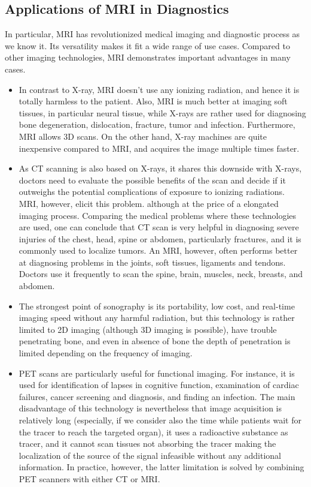 \subsection{Applications of MRI in Diagnostics}
In particular, MRI has revolutionized medical imaging and diagnostic process as we know it. Its versatility makes it fit a wide range of use cases. Compared to other imaging technologies, MRI demonstrates important advantages in many cases.
\begin{itemize}
    \item In contrast to X-ray, MRI doesn't use any ionizing radiation, and hence it is totally harmless to the patient. Also, MRI is much better at imaging soft tissues, in particular neural tissue,  while X-rays are rather used for diagnosing bone degeneration, dislocation, fracture, tumor and infection. Furthermore, MRI allows 3D scans. On the other hand, X-ray machines are quite inexpensive compared to MRI, and acquires the image multiple times faster.
    \item As CT scanning is also based on X-rays, it shares this downside with X-rays, doctors need to evaluate the possible benefits of the scan and decide if it outweighs the potential complications of exposure to ionizing radiations. MRI, however, elicit this problem. although at the price of a elongated imaging process. Comparing the medical problems where these technologies are used, one can conclude that CT scan is very helpful in diagnosing severe injuries of the chest, head, spine or abdomen, particularly fractures, and it is commonly used to localize tumors. An MRI, however, often performs better at diagnosing problems in the joints, soft tissues, ligaments and tendons. Doctors use it frequently to scan the spine, brain, muscles, neck, breasts, and abdomen.
    \item The strongest point of sonography is its portability, low cost, and real-time imaging speed without any harmful radiation, but this technology is rather limited to 2D imaging (although 3D imaging is possible), have trouble penetrating bone, and even in absence of bone the depth of penetration is limited depending on the frequency of imaging.
    \item PET scans are particularly useful for functional imaging. For instance, it is used for identification of lapses in cognitive function, examination of cardiac failures, cancer screening and diagnosis, and finding an infection. The main disadvantage of this technology is nevertheless that image acquisition is relatively long (especially, if we consider also the time while patients wait for the tracer to reach the targeted organ), it uses a radioactive substance as tracer, and it cannot scan tissues not absorbing the tracer making the localization of the source of the signal infeasible without any additional information. In practice, however, the latter limitation is solved by combining PET scanners with either CT or MRI.
\end{itemize}
